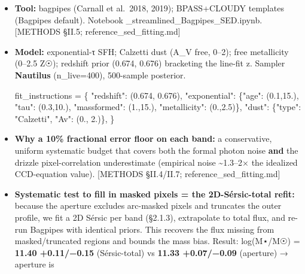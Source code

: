 \documentclass[
]{article}
\newenvironment{Shaded}{}{}
\newcommand{\FloatTok}[1]{\textcolor[rgb]{0.25,0.63,0.44}{#1}}
\newcommand{\NormalTok}[1]{#1}
\newcommand{\OperatorTok}[1]{\textcolor[rgb]{0.40,0.40,0.40}{#1}}
\newcommand{\StringTok}[1]{\textcolor[rgb]{0.25,0.44,0.63}{#1}}
\newcommand{\BreakablePath}[1]{{\ttfamily\sloppy #1}}
\begin{document}
\begin{itemize}
\item
  \textbf{Tool:} \BreakablePath{bagpipes} (Carnall et al.~2018, 2019);
  BPASS+CLOUDY templates (Bagpipes default). Notebook
  \BreakablePath{02\_\discretionary{}{}{}streamlined\_\discretionary{}{}{}Bagpipes\_\discretionary{}{}{}SED.\discretionary{}{}{}ipynb}.
  {[}METHODS §II.5; reference\_sed\_fitting.md{]}
\item
  \textbf{Model:} exponential-τ SFH; Calzetti dust (A\_V free, 0--2);
  free metallicity (0--2.5 Z☉); redshift prior (0.674, 0.676) bracketing
  the line-fit z. Sampler \textbf{Nautilus} (n\_live=400), 500-sample
  posterior.

\begin{Shaded}
\begin{Highlighting}[]
\NormalTok{fit\_instructions }\OperatorTok{=}\NormalTok{ \{}
  \StringTok{"redshift"}\NormalTok{:   (}\FloatTok{0.674}\NormalTok{, }\FloatTok{0.676}\NormalTok{),}
  \StringTok{"exponential"}\NormalTok{: \{}\StringTok{"age"}\NormalTok{: (}\FloatTok{0.1}\NormalTok{,}\FloatTok{15.}\NormalTok{), }\StringTok{"tau"}\NormalTok{: (}\FloatTok{0.3}\NormalTok{,}\FloatTok{10.}\NormalTok{),}
                  \StringTok{"massformed"}\NormalTok{: (}\FloatTok{1.}\NormalTok{,}\FloatTok{15.}\NormalTok{), }\StringTok{"metallicity"}\NormalTok{: (}\FloatTok{0.}\NormalTok{,}\FloatTok{2.5}\NormalTok{)\},}
  \StringTok{"dust"}\NormalTok{: \{}\StringTok{"type"}\NormalTok{: }\StringTok{"Calzetti"}\NormalTok{, }\StringTok{"Av"}\NormalTok{: (}\FloatTok{0.}\NormalTok{, }\FloatTok{2.}\NormalTok{)\},}
\NormalTok{\}}
\end{Highlighting}
\end{Shaded}
\item
  \textbf{Why a 10\% fractional error floor on each band:} a
  conservative, uniform systematic budget that covers both the formal
  photon noise \textbf{and} the drizzle pixel-correlation underestimate
  (empirical noise \textasciitilde1.3--2× the idealized CCD-equation
  value). {[}METHODS §II.4/II.7; reference\_sed\_fitting.md{]}
\item
  \textbf{Systematic test to fill in masked pixels = the 2D-Sérsic-total
  refit:} because the aperture excludes arc-masked pixels and truncates
  the outer profile, we fit a 2D Sérsic per band (§2.1.3), extrapolate
  to total flux, and re-run Bagpipes with identical priors. This
  recovers the flux missing from masked/truncated regions and bounds the
  mass bias. Result: log(M⋆/M☉) = \textbf{11.40 +0.11/−0.15}
  (Sérsic-total) vs \textbf{11.33 +0.07/−0.09} (aperture) → aperture is

\end{itemize}
\end{document}
